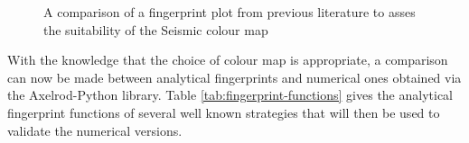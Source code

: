 \begin{figure}[hbtp!]
    \centering
    \caption{A comparison of a fingerprint plot from previous literature to asses the suitability of the Seismic colour map \cite{Ashlock2008}}
    \label{fig:WSLS-ashlock-comparison}
\end{figure}

With the knowledge that the choice of colour map is appropriate, a comparison can now be made between analytical fingerprints and numerical ones obtained via the Axelrod-Python library.
Table \ref{tab:fingerprint-functions} gives the analytical fingerprint functions of several well known strategies that will then be used to validate the numerical versions.

